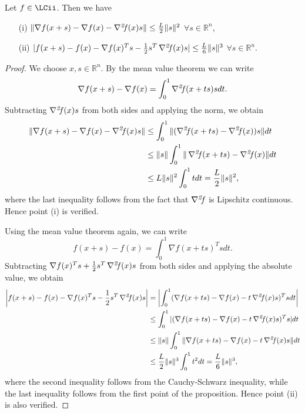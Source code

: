 \documentclass[10pt,a4paper]{article}
\begin{document}
\begin{proposition}\label{prop:arc}
	Let $f\in \LCii$. Then we have
	\begin{itemize}
		\item[(i)] $\|\nabla f(x + s) - \nabla f(x) - \operatorname*{\mathit{\nabla^2 \!f}}(x)s\| \leq \frac{L}{2}\|s\|^2$ $\forall s \in \mathbb{R}^n$,
		\item[(ii)] $|f(x + s) - f(x) - \nabla f(x)^T s - \frac{1}{2}s^T \operatorname*{\mathit{\nabla^2 \!f}}(x)s| \leq \frac{L}{6}\|s\|^3$ $\forall s \in \mathbb{R}^n$.
	\end{itemize}
\end{proposition}
\begin{proof}
	We choose $x, s \in \mathbb{R}^n$. By the mean value theorem we can write
	\begin{equation*}
		\nabla f(x + s) - \nabla f(x) = \int_0^1 \operatorname*{\mathit{\nabla^2 \!f}}(x + ts) sdt.
	\end{equation*}
	Subtracting $\operatorname*{\mathit{\nabla^2 \!f}}(x)s$ from both sides and applying the norm, we obtain
	\begin{align*}
		\|\nabla f(x + s) - \nabla f(x) - \operatorname*{\mathit{\nabla^2 \!f}}(x)s\| &\leq \int_0^1 \|(\operatorname*{\mathit{\nabla^2 \!f}}(x + ts) - \operatorname*{\mathit{\nabla^2 \!f}}(x))s\| dt \\
		&\leq \|s\| \int_0^1 \|\operatorname*{\mathit{\nabla^2 \!f}}(x + ts) - \operatorname*{\mathit{\nabla^2 \!f}}(x)\| dt \\
		&\leq L\|s\|^2 \int_0^1 t dt = \frac{L}{2}\|s\|^2,
	\end{align*}
where the last inequality follows from the fact that $\operatorname*{\mathit{\nabla^2 \!f}}$ is Lipschitz continuous. Hence point (i) is verified.
\par Using the mean value theorem again, we can write
	\begin{equation*}
		f(x + s) - f(x) = \int_0^1 \nabla f(x + ts)^T s dt.
	\end{equation*}
	Subtracting $\nabla f(x)^T s + \frac{1}{2}s^T \operatorname*{\mathit{\nabla^2 \!f}}(x)s$ from both sides and applying the absolute value, we obtain
	\begin{align*}
		\left|f(x + s) - f(x) - \nabla f(x)^T s - \frac{1}{2}s^T \operatorname*{\mathit{\nabla^2 \!f}}(x)s\right| &= \left|\int_0^1 (\nabla f(x + ts) - \nabla f(x) - t\operatorname*{\mathit{\nabla^2 \!f}}(x)s)^T s dt\right| \\
		&\leq \int_0^1 |(\nabla f(x + ts) - \nabla f(x) - t\operatorname*{\mathit{\nabla^2 \!f}}(x)s)^T s| dt \\
		&\leq \|s\| \int_0^1 \|\nabla f(x + ts) - \nabla f(x) - t\operatorname*{\mathit{\nabla^2 \!f}}(x)s\| dt \\
		&\leq \frac{L}{2}\|s\|^3 \int_0^1 t^2 dt = \frac{L}{6}\|s\|^3,
	\end{align*}
	where the second inequality follows from the Cauchy-Schwarz inequality, while the last inequality follows from the first point of the proposition. Hence point (ii) is also verified.
\end{proof}
\end{document}
